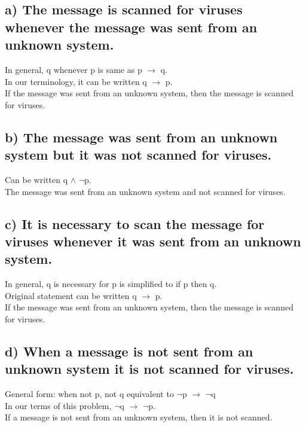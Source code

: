 \documentclass[11pt, oneside]{article} %
\numberwithin{equation}{section} %
\numberwithin{figure}{section} %
\numberwithin{table}{section} %
\begin{document}
\subsection{a) The message is scanned for viruses whenever the message was sent from an unknown system.}
In general, q whenever p is same as p $\rightarrow$ q.\\
In our terminology, it can be written q $\rightarrow$ p. \\
If the message was sent from an unknown system, then the message is scanned for viruses.
\subsection{b) The message was sent from an unknown system but it was not scanned for viruses.}
Can be written q $\wedge$ $\neg$p. \\
The message was sent from an unknown system and not scanned for viruses.
\subsection{c) It is necessary to scan the message for viruses whenever it was sent from an unknown system.}
In general, q is necessary for p is simplified to if p then q. \\
Original statement can be written q $\rightarrow$ p. \\
If the message was sent from an unknown system, then the message is scanned for viruses.
\subsection{d) When a message is not sent from an unknown system it is not scanned for viruses.}
General form: when not p, not q equivalent to $\neg$p $\rightarrow$ $\neg$q \\
In our terms of this problem, $\neg$q $\rightarrow$ $\neg$p.\\
If a message is not sent from an unknown system, then it is not scanned.\\

\end{document}
